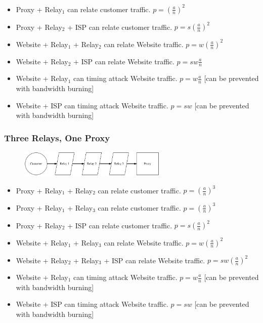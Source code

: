 \documentclass{article}
\begin{document}
\begin{itemize}
\item Proxy + Relay$_1$ can relate customer traffic. $p = (\frac{a}{n})^2$
\item Proxy + Relay$_2$ + ISP can relate customer traffic. $p = s(\frac{a}{n})^2$
\item Website + Relay$_1$ + Relay$_2$ can relate Website traffic. $p = w(\frac{a}{n})^2$
\item Website + Relay$_2$ + ISP can relate Website traffic. $p = sw\frac{a}{n}$
\item Website + Relay$_1$ can timing attack Website traffic. $p = w\frac{a}{n}$ [can be prevented with bandwidth burning]
\item Website + ISP can timing attack Website traffic. $p = sw$ [can be prevented with bandwidth burning]
\end{itemize}

\subsubsection{Three Relays, One Proxy}

\begin{figure}[htbp]
  \centering
  \includegraphics[width = 200pt]{stttc}
  \caption{}
\end{figure}

\begin{itemize}
\item Proxy + Relay$_1$ + Relay$_2$ can relate customer traffic. $p = (\frac{a}{n})^3$
\item Proxy + Relay$_1$ + Relay$_3$ can relate customer traffic. $p = (\frac{a}{n})^3$
\item Proxy + Relay$_2$ + ISP can relate customer traffic. $p = s(\frac{a}{n})^2$
\item Website + Relay$_1$ + Relay$_3$ can relate Website traffic. $p = w(\frac{a}{n})^2$
\item Website + Relay$_2$ + Relay$_3$ + ISP can relate Website traffic. $p = sw(\frac{a}{n})^2$
\item Website + Relay$_1$ can timing attack Website traffic. $p = w\frac{a}{n}$ [can be prevented with bandwidth burning]
\item Website + ISP can timing attack Website traffic. $p = sw$ [can be prevented with bandwidth burning]
\end{itemize}
\end{document}

